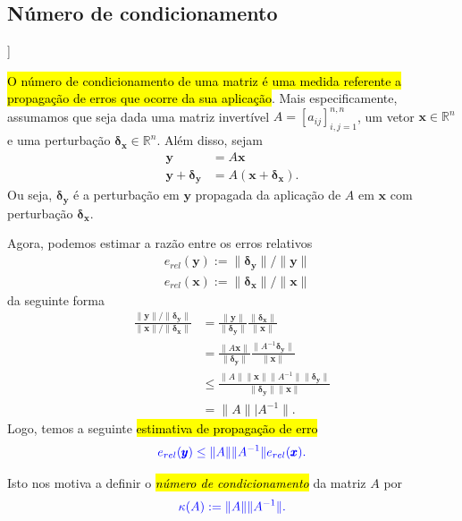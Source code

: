\subsection{Número de condicionamento}

\begin{flushleft}
  [[tag:revisar]]
\end{flushleft}

\hl{O número de condicionamento de uma matriz é uma medida referente a propagação de erros que ocorre da sua aplicação}. Mais especificamente, assumamos que seja dada uma matriz invertível $A = [a_{ij}]_{i,j=1}^{n,n}$, um vetor $\pmb{x}\in\mathbb{R}^n$ e uma perturbação $\pmb{\delta_x}\in\mathbb{R}^n$. Além disso, sejam
\begin{align}
  \pmb{y} &= A\pmb{x}\\
  \pmb{y} + \pmb{\delta_y} &= A(\pmb{x}+\pmb{\delta_x}).
\end{align}
Ou seja, $\pmb{\delta_y}$ é a perturbação em $\pmb{y}$ propagada da aplicação de $A$ em $\pmb{x}$ com perturbação $\pmb{\delta_x}$.

Agora, podemos estimar a razão entre os erros relativos
\begin{align}
  & e_{rel}(\pmb{y}) := \|\pmb{\delta_y}\|/\|\pmb{y}\|\\
  & e_{rel}(\pmb{x}) := \|\pmb{\delta_x}\|/\|\pmb{x}\|
\end{align}
da seguinte forma 
\begin{align}
  \frac{\|\pmb{y}\|/\|\pmb{\delta_y}\|}{\|\pmb{x}\|/\|\pmb{\delta_x}\|} &= \frac{\|\pmb{y}\|}{\|\pmb{\delta_y}\|}\frac{\|\pmb{\delta_x}\|}{\|\pmb{x}\|}\\
  &=\frac{\|A\pmb{x}\|}{\|\pmb{\delta_y}\|}\frac{\|A^{-1}\pmb{\delta_y}\|}{\|\pmb{x}\|} \\
  &\leq \frac{\|A\|\|\pmb{x}\|\|A^{-1}\|\|\pmb{\delta_y}\|}{\|\pmb{\delta_y}\|\|\pmb{x}\|}\\
  &= \|A\||A^{-1}\|.
\end{align}
Logo, temos a seguinte \hl{estimativa de propagação de erro}
\begin{equation}\color{blue}e_{rel}(\pmb{y}) \leq \|A\|\|A^{-1}\|e_{rel}(\pmb{x}).
\end{equation}

Isto nos motiva a definir o \hl{\emph{número de condicionamento}} da matriz $A$ por
\begin{equation}\color{blue}\kappa(A) := \|A\|\|A^{-1}\|.
\end{equation}

